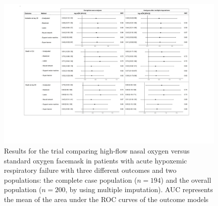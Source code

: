 \documentclass{article}
\begin{document}
\clearpage

\begin{figure}
    \centering
    \includegraphics[width=\textheight , trim=5cm 5cm 5cm 1cm,clip]{figures/STDvsOHD.pdf}
    \caption{Results for the trial comparing high-flow nasal oxygen versus standard oxygen facemask in patients with acute hypoxemic respiratory failure with three different outcomes and two populations: the complete case population ($n=194$) and the overall population ($n=200$, by using multiple imputation). AUC represents the mean of the area under the ROC curves of the outcome models}\label{sfig2}
\end{figure}
\end{document}
